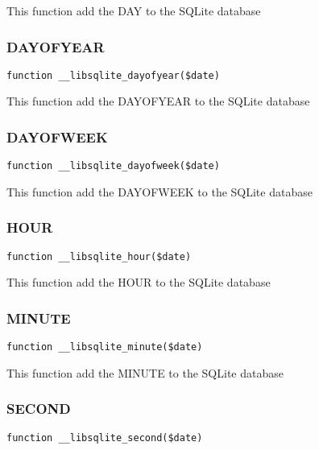 \documentclass[a4paper]{article}
\begin{document}
This function add the DAY to the SQLite database

\hypertarget{toc305}{}
\subsubsection{DAYOFYEAR}

\begin{lstlisting}
function __libsqlite_dayofyear($date)
\end{lstlisting}

This function add the DAYOFYEAR to the SQLite database

\hypertarget{toc306}{}
\subsubsection{DAYOFWEEK}

\begin{lstlisting}
function __libsqlite_dayofweek($date)
\end{lstlisting}

This function add the DAYOFWEEK to the SQLite database

\hypertarget{toc307}{}
\subsubsection{HOUR}

\begin{lstlisting}
function __libsqlite_hour($date)
\end{lstlisting}

This function add the HOUR to the SQLite database

\hypertarget{toc308}{}
\subsubsection{MINUTE}

\begin{lstlisting}
function __libsqlite_minute($date)
\end{lstlisting}

This function add the MINUTE to the SQLite database

\hypertarget{toc309}{}
\subsubsection{SECOND}

\begin{lstlisting}
function __libsqlite_second($date)
\end{lstlisting}
\end{document}

